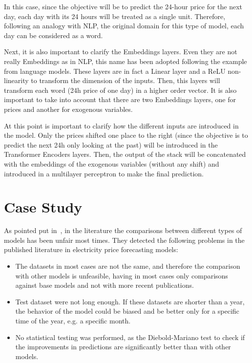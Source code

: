 \documentclass[journal]{IEEEtran}
\begin{document}
In this case, since the objective will be to predict the 24-hour price for the next day, each day with its 24 hours will be treated as a single unit. Therefore, following an analogy with NLP, the original domain for this type of model, each day can be considered as a word.

Next, it is also important to clarify the Embeddings layers. Even they are not really Embeddings as in NLP, this name has been adopted following the example from language models. These layers are in fact a Linear layer and a ReLU non-linearity to transform the dimension of the inputs. Then, this layers will transform each word (24h price of one day) in a higher order vector. It is also important to take into account that there are two Embeddings layers, one for prices and another for exogenous variables. 

At this point is important to clarify how the different inputs are introduced in the model. Only the prices shifted one place to the right (since the objective is to predict the next 24h only looking at the past) will be introduced in the Transformer Encoders layers. Then, the output of the stack will be concatenated with the embeddings of the exogenous variables (without any shift) and introduced in a multilayer perceptron to make the final prediction.


\section{Case Study}

As pointed put in~\cite{lagoForecastingDayaheadElectricity2021}, in the literature the comparisons between different types of models has been unfair most times. They detected the following problems in the published literature in electricity price forecasting models: 

\begin{itemize}
  \item The datasets in most cases are not the same, and therefore the comparison with other models is unfeasible, having in most cases only comparisons against base models and not with more recent publications.
  \item Test dataset were not long enough. If these datasets are shorter than a year, the behavior of the model could be biased and be better only for a specific time of the year, e.g. a specific month. 
  \item No statistical testing was performed, as the Diebold-Mariano test to check if the improvements in predictions are significantly better than with other models.
\end{itemize}
\end{document}
